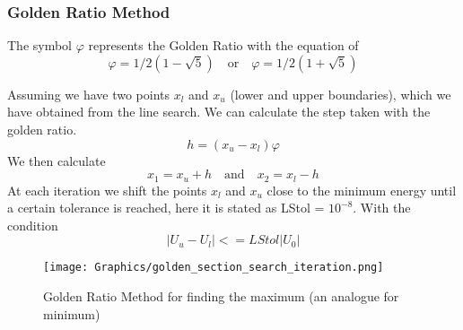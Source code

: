 \documentclass{scrartcl}
\begin{document}
\newpage
\subsubsection{Golden Ratio Method}
\par The symbol $\varphi$ represents the Golden Ratio with the equation of 
\begin{equation} \label{eq:4}
    \varphi = 1/2(1 - \sqrt{5}) \quad \textrm{or} \quad \varphi = 1/2(1 +\sqrt{5})
\end{equation}
\par Assuming we have two points $x_{l}$ and $x_{u}$ (lower and upper boundaries), which we have obtained from the line search. We can calculate the step taken with the golden ratio.
\begin{equation} \label{eq:5}
    h = (x_{u} - x_{l}) \varphi
\end{equation}
We then calculate 
\begin{equation} \label{eq:6}
    x_{1} = x_{u} + h \quad \textrm{and} \quad x_{2} = x_{l} - h
\end{equation}
At each iteration we shift the points $x_{l}$ and $x_{u}$ close to the minimum energy until a certain tolerance is reached, here it is stated as LStol = $10^{-8}$. With the condition
\begin{equation} \label{eq:7}
    |U_{u} - U_{l}| <= LStol|U_{0}| 
\end{equation}

\begin{figure} [h!]
    \centering
    \texttt{[image: Graphics/golden\_section\_search\_iteration.png]}
    \caption{Golden Ratio Method for finding the maximum (an analogue for minimum)}
    \label{fig:my_label 1}
\end{figure}

\newpage
\end{document}
